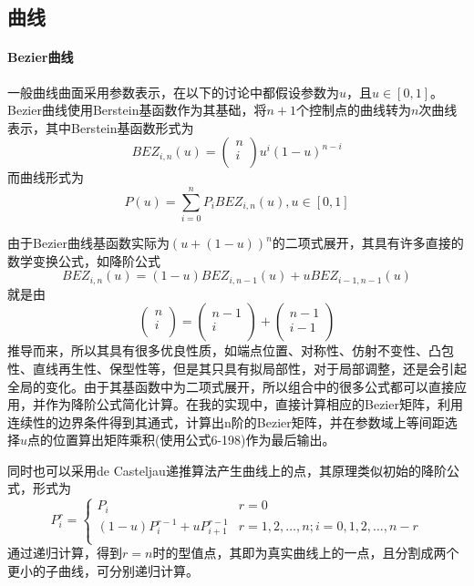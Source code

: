 \documentclass[a4paper,UTF8]{article}
\theoremstyle{definition}
\begin{document}
\subsection{曲线}
\paragraph{Bezier曲线} 一般曲线曲面采用参数表示，在以下的讨论中都假设参数为$u$，且$u\in[0,1]$。Bezier曲线使用Berstein基函数作为其基础，将$n+1$个控制点的曲线转为$n$次曲线表示，其中Berstein基函数形式为
\begin{equation}
BEZ_{i,n}(u)=\left(
\begin{array}{c}
n \\
i \\
\end{array}
\right)u^i(1-u)^{n-i}
\end{equation}
而曲线形式为
\begin{equation}
P(u)=\sum_{i=0}^{n}P_iBEZ_{i,n}(u), u\in[0,1]
\end{equation}
\par 由于Bezier曲线基函数实际为$(u+(1-u))^n$的二项式展开，其具有许多直接的数学变换公式，如降阶公式
\begin{equation}
BEZ_{i,n}(u)=(1-u)BEZ_{i,n-1}(u)+uBEZ_{i-1,n-1}(u)
\end{equation}
就是由
\begin{equation}
\left(
\begin{array}{c}
n \\
i \\
\end{array}
\right)=
\left(
\begin{array}{c}
n-1 \\
i \\
\end{array}
\right)+
\left(
\begin{array}{c}
n-1 \\
i-1 \\
\end{array}
\right)
\end{equation}
推导而来，所以其具有很多优良性质，如端点位置、对称性、仿射不变性、凸包性、直线再生性、保型性等，但是其只具有拟局部性，对于局部调整，还是会引起全局的变化。由于其基函数中为二项式展开，所以组合中的很多公式都可以直接应用，并作为降阶公式简化计算。在我的实现中，直接计算相应的Bezier矩阵，利用连续性的边界条件得到其通式，计算出n阶的Bezier矩阵，并在参数域上等间距选择$u$点的位置算出矩阵乘积(使用公式6-198)作为最后输出。
\par 同时也可以采用de Casteljau递推算法产生曲线上的点，其原理类似初始的降阶公式，形式为
\begin{equation}
P_i^{r}=\left\{
\begin{array}{ll}
P_i & r=0 \\
(1-u)P_i^{r-1}+uP_{i+1}^{r-1} & r=1,2,\ldots,n; i=0,1,2,\ldots,n-r \\
\end{array}
\right.
\end{equation}
通过递归计算，得到$r=n$时的型值点，其即为真实曲线上的一点，且分割成两个更小的子曲线，可分别递归计算。
\end{document}
